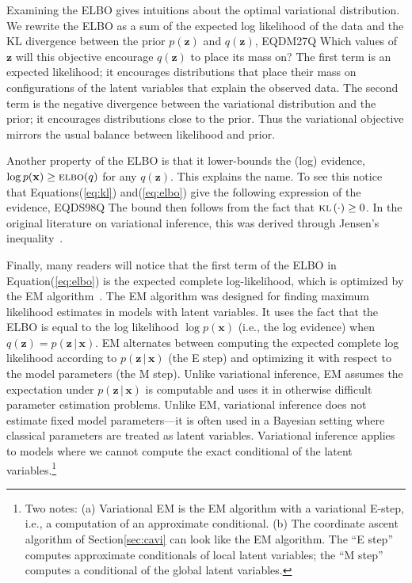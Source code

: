\documentclass{article}
\begin{document}
Examining the \gls{ELBO} gives intuitions about the optimal
variational distribution.  We rewrite the \gls{ELBO} as a sum of the
expected log likelihood of the data and the \gls{KL} divergence
between the prior $p({\mathbf{z}})$ and $q({\mathbf{z}})$,
EQDM27Q
Which values of ${\mathbf{z}}$ will this objective encourage $q({\mathbf{z}})$ to place
its mass on? The first term is an expected likelihood; it encourages
distributions that place their mass on configurations of the latent
variables that explain the observed data. The second term is the
negative divergence between the variational distribution and the
prior; it encourages distributions close to the prior.  Thus the
variational objective mirrors the usual balance between likelihood and
prior.

Another property of the \gls{ELBO} is that it lower-bounds the (log)
evidence, $\log p({\mathbf{x}}) \geq {\textsc{elbo}}(q)$ for any $q({\mathbf{z}})$. This explains
the name. To see this notice that Equations\nobreakspace \textup {(\ref {eq:kl})} and\nobreakspace  \textup {(\ref {eq:elbo})} give the
following expression of the evidence,
EQDS98Q
The bound then follows from the fact that ${\textsc{kl}\left({\cdot}\right)} \geq 0$.  In the
original literature on variational inference, this was derived through
Jensen's inequality~\citep{Jordan:1999}.

Finally, many readers will notice that the first term of the
\gls{ELBO} in Equation\nobreakspace \textup {(\ref {eq:elbo})} is the expected complete log-likelihood,
which is optimized by the \gls{EM}
algorithm~\citep{Dempster:1977}. The \gls{EM} algorithm was designed
for finding maximum likelihood estimates in models with latent
variables. It uses the fact that the \gls{ELBO} is equal to the log
likelihood $\log p({\mathbf{x}})$ (i.e., the log evidence) when
$q({\mathbf{z}}) = p({\mathbf{z}} {\,\vert\,} {\mathbf{x}})$.  \gls{EM} alternates between computing the
expected complete log likelihood according to $p({\mathbf{z}} {\,\vert\,} {\mathbf{x}})$ (the E
step) and optimizing it with respect to the model parameters (the M
step). Unlike variational inference, \gls{EM} assumes the expectation
under $p({\mathbf{z}} {\,\vert\,} {\mathbf{x}})$ is computable and uses it in otherwise difficult
parameter estimation problems. Unlike \gls{EM}, variational inference
does not estimate fixed model parameters---it is often used in a
Bayesian setting where classical parameters are treated as latent
variables. Variational inference applies to models where we cannot
compute the exact conditional of the latent variables.\footnote{Two
  notes: (a) Variational \gls{EM} is the \gls{EM} algorithm with a
  variational E-step, i.e., a computation of an approximate
  conditional. (b) The coordinate ascent algorithm of Section\nobreakspace \ref {sec:cavi}
  can look like the \gls{EM} algorithm. The ``E step'' computes
  approximate conditionals of local latent variables; the ``M step''
  computes a conditional of the global latent variables.  }
\end{document}
